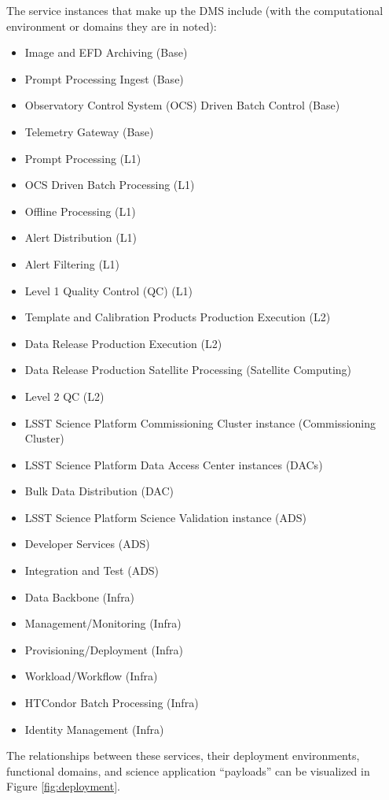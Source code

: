 \documentclass[DM,lsstdraft,toc]{lsstdoc}
\begin{document}
The service instances that make up the DMS include (with the
computational environment or domains they are in noted):
\begin{itemize}
\item
  Image and EFD Archiving (Base)
\item
  Prompt Processing Ingest (Base)
\item
  Observatory Control System (OCS) Driven Batch Control (Base)
\item
  Telemetry Gateway (Base)
\item
  Prompt Processing (L1)
\item
  OCS Driven Batch Processing (L1)
\item
  Offline Processing (L1)
\item
  Alert Distribution (L1)
\item
  Alert Filtering (L1)
\item
  Level 1 Quality Control (QC) (L1)
\item
  Template and Calibration Products Production Execution (L2)
\item
  Data Release Production Execution (L2)
\item
  Data Release Production Satellite Processing (Satellite Computing)
\item
  Level 2 QC (L2)
\item
  LSST Science Platform Commissioning Cluster instance (Commissioning
  Cluster)
\item
  LSST Science Platform Data Access Center instances (DACs)
\item
  Bulk Data Distribution (DAC)
\item
  LSST Science Platform Science Validation instance (ADS)
\item
  Developer Services (ADS)
\item
  Integration and Test (ADS)
\item
  Data Backbone (Infra)
\item
  Management/Monitoring (Infra)
\item
  Provisioning/Deployment (Infra)
\item
  Workload/Workflow (Infra)
\item
  HTCondor Batch Processing (Infra)
\item
  Identity Management (Infra)
\end{itemize}

The relationships between these services, their deployment environments,
functional domains, and science application ``payloads'' can be
visualized in Figure \ref{fig:deployment}.
\end{document}
